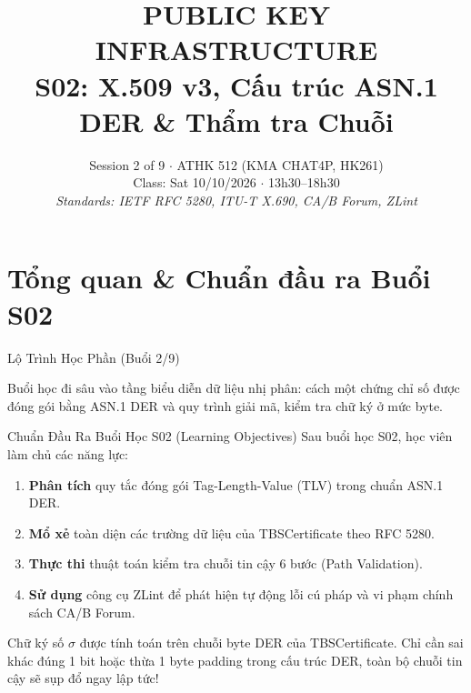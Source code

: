 
\title{\color{hcmutblue}\textbf{\LARGE PUBLIC KEY INFRASTRUCTURE}\\[0.25em]
       \color{hcmutblue}\textbf{\large S02: X.509 v3, Cấu trúc ASN.1 DER \& Thẩm tra Chuỗi}}
\date{\footnotesize Session 2 of 9 $\cdot$ ATHK 512 (KMA CHAT4P, HK261)\\
      Class: Sat 10/10/2026 $\cdot$ 13h30--18h30\\
      \textit{Standards: IETF RFC 5280, ITU-T X.690, CA/B Forum, ZLint}}


\PKItitleframe

\section{Tổng quan \& Chuẩn đầu ra Buổi S02}

\begin{frame}{Lộ Trình Học Phần (Buổi 2/9)}
  \centering
  \vspace{0.4em}
  \raggedright\small
  Buổi học đi sâu vào tầng biểu diễn dữ liệu nhị phân: cách một chứng chỉ số được đóng gói bằng ASN.1 DER và quy trình giải mã, kiểm tra chữ ký ở mức byte.
\end{frame}

\begin{frame}{Chuẩn Đầu Ra Buổi Học S02 (Learning Objectives)}
  \small
  Sau buổi học S02, học viên làm chủ các năng lực:
  \begin{enumerate}
    \item \textbf{Phân tích} quy tắc đóng gói Tag-Length-Value (TLV) trong chuẩn ASN.1 DER.
    \item \textbf{Mổ xẻ} toàn diện các trường dữ liệu của TBSCertificate theo RFC 5280.
    \item \textbf{Thực thi} thuật toán kiểm tra chuỗi tin cậy 6 bước (Path Validation).
    \item \textbf{Sử dụng} công cụ ZLint để phát hiện tự động lỗi cú pháp và vi phạm chính sách CA/B Forum.
  \end{enumerate}

  \begin{keybox}
    Chữ ký số $\sigma$ được tính toán trên chuỗi byte DER của TBSCertificate. Chỉ cần sai khác đúng 1 bit hoặc thừa 1 byte padding trong cấu trúc DER, toàn bộ chuỗi tin cậy sẽ sụp đổ ngay lập tức!
  \end{keybox}
\end{frame}

